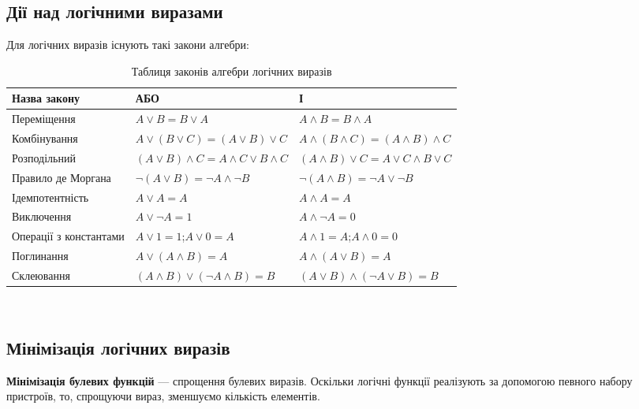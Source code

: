 \subsection{Дії над логічними виразами}
Для логічних виразів існують такі закони алгебри:
\begin{center}
\begin{table}[h!]
\begin{tabu} { | X[3,с] | X[3,c] | X[3,c] | }
 \hline
Назва закону& АБО & І \\
 \hline
 Переміщення &$A \lor B = B \lor A$  &$A \wedge B = B \wedge A $  \\
\hline
 Комбінування &$A \lor (B \lor C)= (A \lor B) \lor C $  &$A \wedge (B \wedge C)= (A \wedge B) \wedge C $  \\
\hline
Розподільний &$(A \lor B) \wedge C= A \wedge C \lor B \wedge C $  \vspace{1mm}&$(A \wedge B) \lor C= A \lor C \wedge B \lor C $ \vspace{1mm}   \\
\hline
Правило де Моргана & $\neg(A \lor B) = \neg A \wedge \neg B$& $\neg(A \wedge B) = \neg A \lor \neg B$\\
\hline
Ідемпотентність & $A \lor A = A$ &$A \wedge A = A $   \\
\hline
Виключення &$A \lor \neg A = 1$ & $A \wedge \neg A = 0$  \\
\hline
Операції з константами & $A \lor 1= 1$;$A \lor 0 = A$&$A \wedge 1 = A$;$A \wedge 0 = 0$  \\
\hline
Поглинання &$A \lor (A \wedge B) = A $ &$A \wedge (A \lor B) = A $   \\
\hline
Склеювання&$(A \wedge B) \lor (\neg A \wedge B)=B$&$(A \lor B) \wedge (\neg A \lor B)=B$   \\
\hline
\end{tabu}
\vspace{6mm}\\
\caption{Таблиця законів алгебри логічних виразів}\label{tab:logic_formulas}
\end{table}
\end{center}

\newpage
\subsection{Мінімізація логічних виразів}
\textbf{Мінімізація булевих функцій} — спрощення булевих виразів. Оскільки логічні функції реалізують за допомогою певного набору пристроїв, то, спрощуючи вираз, зменшуємо кількість елементів.


